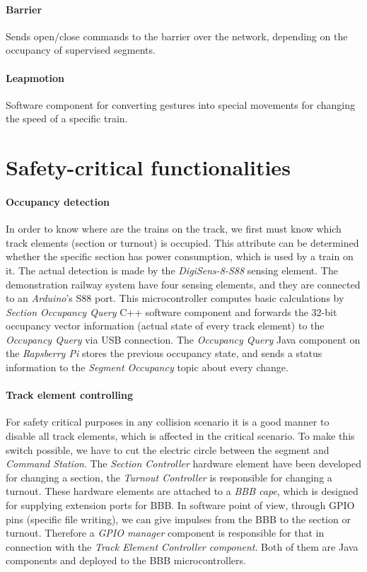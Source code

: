 \paragraph{Barrier} 
Sends open/close commands to the barrier over the network, depending on the occupancy of supervised segments.
\paragraph{Leapmotion}
Software component for converting gestures into special movements for changing the speed of a specific train.

\section{Safety-critical functionalities}\label{section:SC-Functionalities}


\paragraph{Occupancy detection}\label{par:FunctionOccupancyDetection}
In order to know where are the trains on the track, we first must know which track elements (section or turnout) is occupied. This attribute can be determined whether the specific section has power consumption, which is used by a train on it. The actual detection is made by the \textit{DigiSens-8-S88} sensing element. The demonstration railway system have four sensing elements, and they are connected to an \textit{Arduino}'s S88 port. This microcontroller computes basic calculations by \textit{Section Occupancy Query} C++ software component and forwards the 32-bit occupancy vector information (actual state of every track element) to the \textit{Occupancy Query} via USB connection. The \textit{ Occupancy Query} Java component on the \textit{Rapsberry Pi} stores the previous occupancy state, and sends a status information to the \textit{Segment Occupancy} topic about every change.

\paragraph{Track element controlling}\label{par:FunctionTEC}
For safety critical purposes in any collision scenario it is a good manner to disable all track elements, which is affected in the critical scenario. To make this switch possible, we have to cut the electric circle between the segment and \textit{Command Station}. The \textit{Section Controller} hardware element have been developed for changing a section,  the \textit{Turnout Controller} is responsible for changing a turnout. These hardware elements are attached to a \textit{BBB cape}, which is designed for supplying extension ports for BBB. In software point of view, through GPIO pins (specific file writing), we can give impulses from the BBB to the section or turnout. Therefore a \textit{GPIO manager} component is responsible for that in connection with the \textit{Track Element Controller component}. Both of them are Java components and deployed to the BBB microcontrollers.

